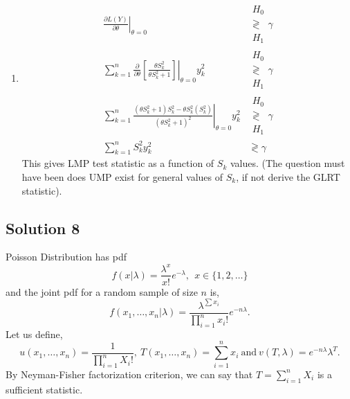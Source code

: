 \documentclass[a4paper,english,12pt]{article}
\begin{document}
\begin{enumerate}[label=(\alph*).]
\item 
\begin{align*}
\left.\frac{\partial L(Y)}{\partial\theta}\right|_{\theta=0}& \substack{H_0\\\gtrless\\ H_1}\gamma\\
\left.\sum\limits_{k=1}^n \frac{\partial}{\partial\theta}\left[\frac{\theta S_k^2}{\theta S_k^2+1}\right]\right|_{\theta=0} y_k^2~& \substack{H_0\\\gtrless\\ H_1}\gamma\\
\left.\sum\limits_{k=1}^n\frac{(\theta S_k^2+1)S_k^2-\theta S_k^2(S_k^2)}{(\theta S_k^2+1)^2}\right|_{\theta=0}y_k^2&\substack{H_0\\\gtrless\\ H_1}\gamma\\
\sum\limits_{k=1}^nS_k^2y_k^2&\gtrless\gamma
\end{align*}
This gives LMP test statistic as a function of $S_k$ values.
(The question must have been does UMP exist for general values of $S_k$, if not derive the GLRT statistic).
\end{enumerate}
\hypertarget{solution8}{\subsection*{Solution 8}}
Poisson Distribution has pdf
\begin{equation*}
f(x|\lambda)=\frac{\lambda^x}{x!}e^{-\lambda},~~x\in \{1,2,\dots\}
\end{equation*}
and the joint pdf for a random sample of size $n$ is,
\begin{equation*}
f(x_1,\dots,x_n|\lambda)=\frac{\lambda^{\sum x_i}}{\prod_{i=1}^n x_i!}e^{-n\lambda}.
\end{equation*}
Let us define,
\begin{equation*}
u(x_1,\dots,x_n)=\frac{1}{\prod_{i=1}^n X_i!}, \ T(x_1,\dots,x_n)=\sum_{i=1}^n  x_i~\mbox{and}~v(T,\lambda)=e^{-n\lambda}\lambda^T.
\end{equation*}
By Neyman-Fisher factorization criterion, we can say that $T=\sum_{i=1}^n X_i$ is a sufficient statistic.
\end{document}
